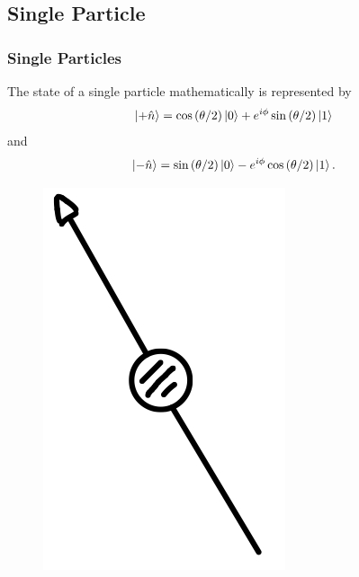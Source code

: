 \documentclass{beamer}
\begin{document}
\subsection{\tiny{Single Particle}}
\begin{frame}
\frametitle{Single Particles}
The state of a single particle mathematically is represented by
\begin{equation}\label{eq:8}
\ket{+\hat{n}}=\cos{(\theta/2)}\ket{0}+e^{i\phi}\sin{(\theta/2)}\ket{1}
\end{equation}
and
\begin{equation} \label{eq:9}
\ket{-\hat{n}}=\sin{(\theta/2)}\ket{0}-e^{i\phi}\cos{(\theta/2)}\ket{1}.
\end{equation}
\begin{figure}
\begin{center}
\includegraphics[width=0.20\linewidth]{Single-Particle.jpeg}
\end{center}
\end{figure}
\end{frame}
\end{document}
